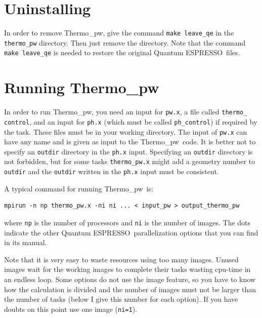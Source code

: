\documentclass[12pt,a4paper,twoside]{report}
\def\qe{{\sc Quantum ESPRESSO}}
\def\thermo{{\sc Thermo}\_{\sc pw}}
\begin{document}
\newpage
{\color{coral}\section{Uninstalling}}
\color{black}

In order to remove \thermo, give the command \texttt{make leave\_qe} in the
\texttt{thermo\_pw} directory. Then just remove the directory. Note that 
the command \texttt{make leave\_qe} is needed to restore the original \qe\ files.

\newpage
{\color{coral}\section{Running \thermo}}
\color{black}

In order to run \thermo, you need an input for \texttt{pw.x},  
a file called \texttt{thermo\_} \texttt{control}, and an input for 
\texttt{ph.x}
(which must be called \texttt{ph\_control}) if required by the task.
 These files must be in your working
directory.
The input of \texttt{pw.x} can have any name and is given as input to
the \thermo\ code. It is better not to specify an \texttt{outdir} 
directory in the \texttt{ph.x} input. Specifying an \texttt{outdir}
directory is not forbidden, but for some tasks \texttt{thermo\_pw.x} 
might add a geometry number to \texttt{outdir} and the
\texttt{outdir} written in the \texttt{ph.x} input must be consistent.

A typical command for running \thermo\ is:

\begin{verbatim}
mpirun -n np thermo_pw.x -ni ni ... < input_pw > output_thermo_pw
\end{verbatim}

where \texttt{np} is the number of processors and \texttt{ni} is the number 
of images. The dots indicate the other \qe\ parallelization options that
you can find in its manual.

Note that it is very easy to waste resources using too many 
images. Unused images wait for the working images to complete
their tasks wasting cpu-time in an endless loop. 
Some options 
do not use the image feature, so you have to know how the calculation 
is divided and the number of images must not
be larger than the number of tasks (below I give this number for each option).
If you have doubts on this point use one image 
(\texttt{ni=1}).
\end{document}
